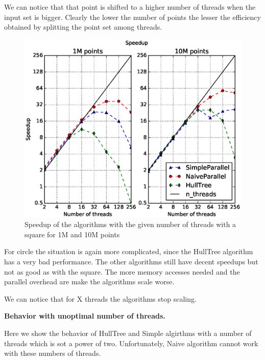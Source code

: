\documentclass[letterpaper]{article}
\newcommand{\mypar}[1]{{\bf #1.}}
\begin{document}
We can notice that that point is shifted to a higher number of threads when the input set is bigger. Clearly the lower the number of points the lesser the efficiency obtained by splitting the point set among threads.

\begin{figure}[!ht]\centering
  \includegraphics[scale=0.33]{./plots/speedup_xeon_square_fixed_points.eps}
  \caption{Speedup of the algorithms with the given number of threads with a square for 1M and 10M points\label{Threads time}}
\end{figure}

For circle the situation is again more complicated, since the HullTree algorithm has a very bad performance.
The other algorithms still have decent speedups but not as good as with the square.
The more memory accesses needed and the parallel overhead are make the algorithms scale worse.



We can notice that for X threads the algorithms stop scaling.

\mypar{Behavior with unoptimal number of threads}

Here we show the behavior of HullTree and Simple algirthms with a number of threads which is sot a power of two. Unfortunately, Naive algorithm cannot work with these numbers of threads.
\end{document}
